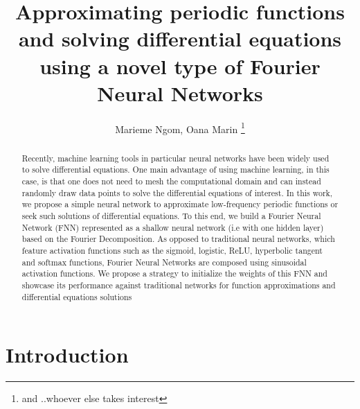 \documentclass[11pt]{article}
\begin{document}

\title{Approximating periodic functions and solving differential equations using a novel type of Fourier Neural Networks}
\author{Marieme Ngom, Oana Marin \footnote{and ..whoever else takes interest}}
\maketitle
\begin{abstract}
Recently, machine learning tools in particular neural networks have been widely used to solve differential equations. One main advantage of using machine learning, in this case, is that one does not need to mesh the computational domain and can instead randomly draw data points to solve the differential equations of interest. In this work, we propose a simple neural network to approximate low-frequency periodic functions or seek such solutions of differential equations. To this end, we build a Fourier Neural Network (FNN) represented as a shallow neural network (i.e with one hidden layer) based on the Fourier Decomposition. As opposed to traditional neural networks, which feature activation functions such as the sigmoid, logistic, ReLU, hyperbolic tangent and softmax functions, Fourier Neural Networks are composed using sinusoidal activation functions. We propose a strategy to initialize the weights of this FNN and showcase its performance against traditional networks for function approximations and differential equations solutions
\end{abstract}




\linenumbers

\section{Introduction}
\end{document}
